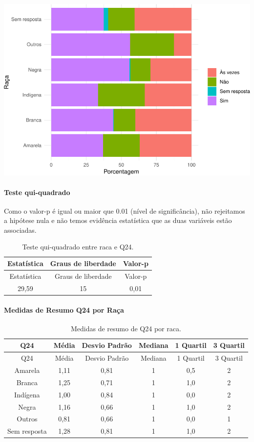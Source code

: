 \documentclass[]{article}
\let\oldparagraph\paragraph
\renewcommand{\paragraph}[1]{\oldparagraph{#1}\mbox{}}
\begin{document}
\begin{center}\includegraphics[width=0.75\linewidth]{relatorio_covid19_files/figure-latex/unnamed-chunk-633-1} \end{center}

\hypertarget{teste-qui-quadrado-55}{%
\paragraph{Teste qui-quadrado}\label{teste-qui-quadrado-55}}

Como o valor-p é igual ou maior que 0.01 (nível de significância), não rejeitamos a hipótese nula e não temos evidência estatística que as duas variáveis estão associadas.

\begin{longtable}[]{@{}ccc@{}}
\caption{\label{tab:unnamed-chunk-635}Teste qui-quadrado entre raca e Q24.}\tabularnewline
\toprule
Estatística & Graus de liberdade & Valor-p\tabularnewline
\midrule
\endfirsthead
\toprule
Estatística & Graus de liberdade & Valor-p\tabularnewline
\midrule
\endhead
29,59 & 15 & 0,01\tabularnewline
\bottomrule
\end{longtable}

\cleardoublepage

\hypertarget{medidas-de-resumo-q24-por-rauxe7a}{%
\paragraph{Medidas de Resumo Q24 por Raça}\label{medidas-de-resumo-q24-por-rauxe7a}}

\begin{longtable}[]{@{}cccccc@{}}
\caption{\label{tab:unnamed-chunk-636}Medidas de resumo de Q24 por raca.}\tabularnewline
\toprule
Q24 & Média & Desvio Padrão & Mediana & 1 Quartil & 3 Quartil\tabularnewline
\midrule
\endfirsthead
\toprule
Q24 & Média & Desvio Padrão & Mediana & 1 Quartil & 3 Quartil\tabularnewline
\midrule
\endhead
Amarela & 1,11 & 0,81 & 1 & 0,5 & 2\tabularnewline
Branca & 1,25 & 0,71 & 1 & 1,0 & 2\tabularnewline
Indígena & 1,00 & 0,84 & 1 & 0,0 & 2\tabularnewline
Negra & 1,16 & 0,66 & 1 & 1,0 & 2\tabularnewline
Outros & 0,81 & 0,66 & 1 & 0,0 & 1\tabularnewline
Sem resposta & 1,28 & 0,81 & 1 & 1,0 & 2\tabularnewline
\bottomrule
\end{longtable}
\end{document}
